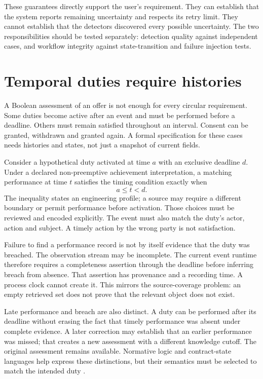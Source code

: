 \documentclass[12pt,a4paper,oneside,openany]{book}
\begin{document}
These guarantees directly support the user's requirement. They can establish
that the system reports remaining uncertainty and respects its retry limit.
They cannot establish that the detectors discovered every possible uncertainty.
The two responsibilities should be tested separately: detection quality against
independent cases, and workflow integrity against state-transition and failure
injection tests.

\section{Temporal duties require histories}
\label{merge:M03:11}

\label{sec:proof-temporal}
A Boolean assessment of an offer is not enough for every circular requirement.
Some duties become active after an event and must be performed before a
deadline. Others must remain satisfied throughout an interval. Consent can be
granted, withdrawn and granted again. A formal specification for these cases
needs histories and states, not just a snapshot of current fields.

Consider a hypothetical duty activated at time $a$ with an exclusive deadline
$d$. Under a declared non-preemptive achievement interpretation, a matching
performance at time $t$ satisfies the timing condition exactly when
\begin{equation}
 a\leq t<d.
 \label{eq:performance-window}
\end{equation}
The inequality states an engineering profile; a source may require a different
boundary or permit performance before activation. Those choices must be
reviewed and encoded explicitly. The event must also match the duty's actor,
action and subject. A timely action by the wrong party is not satisfaction.

Failure to find a performance record is not by itself evidence that the duty
was breached. The observation stream may be incomplete. The current event
runtime therefore requires a completeness assertion through the deadline before
inferring breach from absence. That assertion has provenance and a recording
time. A process clock cannot create it. This mirrors the source-coverage
problem: an empty retrieved set does not prove that the relevant object does
not exist.

Late performance and breach are also distinct. A duty can be performed after
its deadline without erasing the fact that timely performance was absent under
complete evidence. A later correction may establish that an earlier performance
was missed; that creates a new assessment with a different knowledge cutoff.
The original assessment remains available. Normative logic and contract-state
languages help express these distinctions, but their semantics must be selected
to match the intended duty \citep{violations2006,normative2016,stipula2021}.
\end{document}
